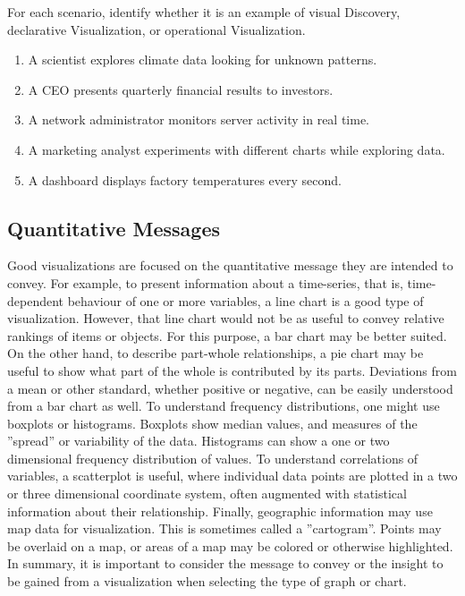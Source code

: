 \begin{exerciseboxpaper}
For each scenario, identify whether it is an example of visual Discovery, declarative Visualization, or operational Visualization.

\begin{enumerate}
\item A scientist explores climate data looking for unknown patterns.
\item A CEO presents quarterly financial results to investors.
\item A network administrator monitors server activity in real time.
\item A marketing analyst experiments with different charts while exploring data.
\item A dashboard displays factory temperatures every second.
\end{enumerate}
\end{exerciseboxpaper}

\subsection*{Quantitative Messages} 

Good visualizations are focused on the quantitative message they are intended to convey. For example, to present information about a time-series, that is, time-dependent behaviour of one or more variables, a line chart is a good type of visualization. However, that line chart would not be as useful to convey relative rankings of items or objects. For this purpose, a bar chart may be better suited. On the other hand, to describe part-whole relationships, a pie chart may be useful to show what part of the whole is contributed by its parts. Deviations from a mean or other standard, whether positive or negative, can be easily understood from a bar chart as well. To understand frequency distributions, one might use boxplots or histograms. Boxplots show median values, and measures of the ''spread'' or variability of the data. Histograms can show a one or two dimensional frequency distribution of values. To understand correlations of variables, a scatterplot is useful, where individual data points are plotted in a two or three dimensional coordinate system, often augmented with statistical information about their relationship. Finally, geographic information may use map data for visualization. This is sometimes called a ''cartogram''. Points may be overlaid on a map, or areas of a map may be colored or otherwise highlighted. In summary, it is important to consider the message to convey or the insight to be gained from a visualization when selecting the type of graph or chart.

